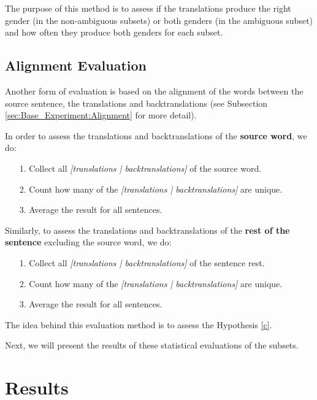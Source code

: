 The purpose of this method is to assess if the translations produce the right gender (in the non-ambiguous subsets) or both genders (in the ambiguous subset) and how often they produce both genders for each subset.

\subsection{Alignment Evaluation}
\label{sec:Base_Experiment:Statistics:Alignment}
Another form of evaluation is based on the alignment of the words between the source sentence, the translations and backtranslations (see Subsection \ref{sec:Base_Experiment:Alignment} for more detail).

In order to assess the translations and backtranslations of the \textbf{source word}, we do:
\begin{enumerate}
    \item[1. ] Collect all \textit{[translations | backtranslations]} of the source word.
    \item[2. ] Count how many of the \textit{[translations | backtranslations]} are unique.
    \item[3. ] Average the result for all sentences.
\end{enumerate}

Similarly, to assess the translations and backtranslations of the \textbf{rest of the sentence} excluding the source word, we do:
\begin{enumerate}
    \item[1. ] Collect all \textit{[translations | backtranslations]} of the sentence rest.
    \item[2. ] Count how many of the \textit{[translations | backtranslations]} are unique.
    \item[3. ] Average the result for all sentences.
\end{enumerate}

The idea behind this evaluation method is to assess the Hypothesis \ref{c}.

Next, we will present the results of these statistical evaluations of the subsets.

\section{Results}
\label{ch:Base_Experiment:Results}

